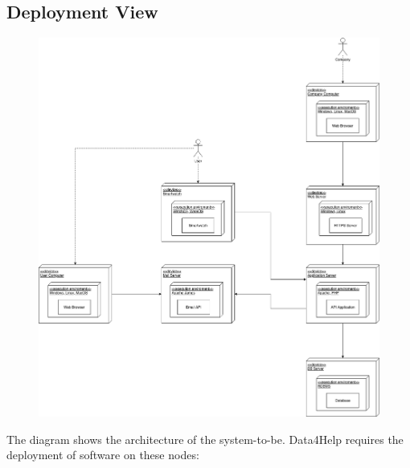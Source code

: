 \documentclass{article}
\begin{document}
\subsection{Deployment View}
\begin{figure}[h!]
\centering
    \textbf{}\par\medskip
	\includegraphics[width= \linewidth]{depl.png}
\end{figure}
The diagram shows the architecture of the system-to-be. Data4Help requires the deployment of software on these nodes:
\end{document}
